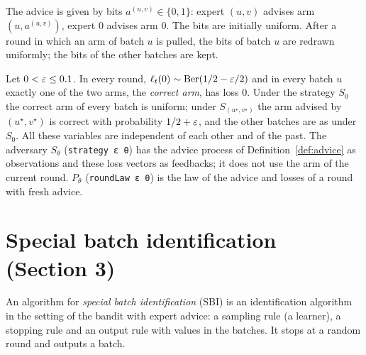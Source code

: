 \begin{definition}
  \label{def:advice}
  \leanok
  The advice is given by bits $a^{(u,v)} \in \{0,1\}$: expert $(u, v)$ advises arm
  $(u, a^{(u,v)})$, expert $0$ advises arm $0$. The bits are initially uniform. After a round in
  which an arm of batch $u$ is pulled, the bits of batch $u$ are redrawn uniformly; the bits of
  the other batches are kept.
\end{definition}

\begin{definition}
  \label{def:strategy}
  \leanok
  Let $0 < \varepsilon \le 0.1$. In every round, $\ell_t(0) \sim \mathrm{Ber}(1/2 - \varepsilon/2)$ and in every batch
  $u$ exactly one of the two arms, the \emph{correct arm}, has loss $0$. Under the strategy $S_0$
  the correct arm of every batch is uniform; under $S_{(u^\star, v^\star)}$ the arm advised by
  $(u^\star, v^\star)$ is correct with probability $1/2 + \varepsilon$, and the other batches are as
  under $S_0$. All these variables are independent of each other and of the past. The adversary
  $S_\theta$ (\texttt{strategy ε θ}) has the advice process of Definition~\ref{def:advice} as
  observations and these loss vectors as feedbacks; it does not use the arm of the current round.
  $P_\theta$ (\texttt{roundLaw ε θ}) is the law of the advice and losses of a round with fresh
  advice.
\end{definition}

\section{Special batch identification (Section 3)}

\begin{definition}
  \label{def:sbi}
  \leanok
  An algorithm for \emph{special batch identification} (SBI) is an identification algorithm in the
  setting of the bandit with expert advice: a sampling rule (a learner), a stopping rule and an
  output rule with values in the batches. It stops at a random round and outputs a batch.
\end{definition}

